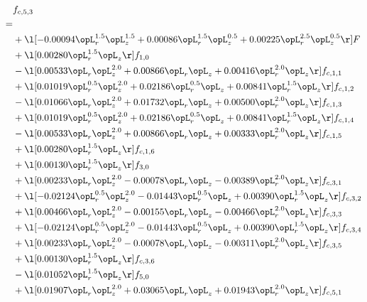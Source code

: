 \begin{alignat}{2} 
\label{eq:f_53_1} 
& f_{c,5,3} \nonumber \\ 
 = \\ 
& + \l[  -0.00094 \opL_r^{1.5} \opL_z^{1.5} +  0.00086 \opL_r^{1.5} \opL_z^{0.5} +  0.00225 \opL_r^{2.5} \opL_z^{0.5}  \r] F \nonumber \\ 
& + \l[  0.00280 \opL_r^{1.5} \opL_z  \r] f_{1,0} \nonumber \\ 
& - \l[  0.00533 \opL_r \opL_z^{2.0} +  0.00866 \opL_r \opL_z +  0.00416 \opL_r^{2.0} \opL_z  \r] f_{c,1,1} \nonumber \\ 
& + \l[  0.01019 \opL_r^{0.5} \opL_z^{2.0} +  0.02186 \opL_r^{0.5} \opL_z +  0.00841 \opL_r^{1.5} \opL_z  \r] f_{c,1,2} \nonumber \\ 
& - \l[  0.01066 \opL_r \opL_z^{2.0} +  0.01732 \opL_r \opL_z +  0.00500 \opL_r^{2.0} \opL_z  \r] f_{c,1,3} \nonumber \\ 
& + \l[  0.01019 \opL_r^{0.5} \opL_z^{2.0} +  0.02186 \opL_r^{0.5} \opL_z +  0.00841 \opL_r^{1.5} \opL_z  \r] f_{c,1,4} \nonumber \\ 
& - \l[  0.00533 \opL_r \opL_z^{2.0} +  0.00866 \opL_r \opL_z +  0.00333 \opL_r^{2.0} \opL_z  \r] f_{c,1,5} \nonumber \\ 
& + \l[  0.00280 \opL_r^{1.5} \opL_z  \r] f_{c,1,6} \nonumber \\ 
& + \l[  0.00130 \opL_r^{1.5} \opL_z  \r] f_{3,0} \nonumber \\ 
& + \l[  0.00233 \opL_r \opL_z^{2.0}   -0.00078 \opL_r \opL_z   -0.00389 \opL_r^{2.0} \opL_z  \r] f_{c,3,1} \nonumber \\ 
& + \l[  -0.02124 \opL_r^{0.5} \opL_z^{2.0}   -0.01443 \opL_r^{0.5} \opL_z +  0.00390 \opL_r^{1.5} \opL_z  \r] f_{c,3,2} \nonumber \\ 
& + \l[  0.00466 \opL_r \opL_z^{2.0}   -0.00155 \opL_r \opL_z   -0.00466 \opL_r^{2.0} \opL_z  \r] f_{c,3,3} \nonumber \\ 
& + \l[  -0.02124 \opL_r^{0.5} \opL_z^{2.0}   -0.01443 \opL_r^{0.5} \opL_z +  0.00390 \opL_r^{1.5} \opL_z  \r] f_{c,3,4} \nonumber \\ 
& + \l[  0.00233 \opL_r \opL_z^{2.0}   -0.00078 \opL_r \opL_z   -0.00311 \opL_r^{2.0} \opL_z  \r] f_{c,3,5} \nonumber \\ 
& + \l[  0.00130 \opL_r^{1.5} \opL_z  \r] f_{c,3,6} \nonumber \\ 
& - \l[  0.01052 \opL_r^{1.5} \opL_z  \r] f_{5,0} \nonumber \\ 
& + \l[  0.01907 \opL_r \opL_z^{2.0} +  0.03065 \opL_r \opL_z +  0.01943 \opL_r^{2.0} \opL_z  \r] f_{c,5,1} \nonumber \\ 

\end{alignat}
